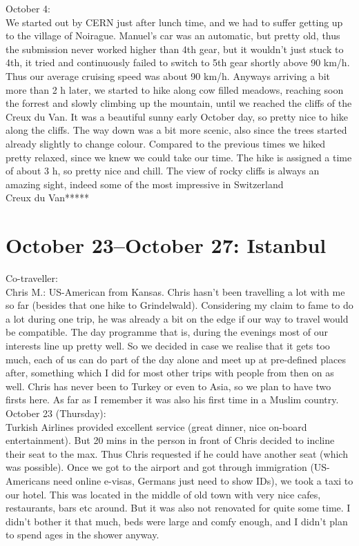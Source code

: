 October 4:\\
We started out by CERN just after lunch time, and we had to suffer getting up to the village of Noirague. Manuel's car was an automatic, but pretty old, thus the submission never worked higher than 4th gear, but it wouldn't just stuck to 4th, it tried and continuously failed to switch to 5th gear shortly above 90 km/h. Thus our average cruising speed was about 90 km/h. Anyways arriving a bit more than 2 h later, we started to hike along cow filled meadows, reaching soon the forrest and slowly climbing up the mountain, until we reached the cliffs of the Creux du Van. It was a beautiful sunny early October day, so pretty nice to hike along the cliffs. The way down was a bit more scenic, also since the trees started already slightly to change colour. Compared to the previous times we hiked pretty relaxed, since we knew we could take our time. The hike is assigned a time of about 3 h, so pretty nice and chill. The view of rocky cliffs is always an amazing sight, indeed some of the most impressive in Switzerland\\

Creux du Van*****

\section{October 23--October 27: Istanbul}
\label{Istanbul2014}

Co-traveller:\\
Chris M.: US-American from Kansas. Chris hasn't been travelling a lot with me so far (besides that one hike to Grindelwald). Considering my claim to fame to do a lot during one trip, he was already a bit on the edge if our way to travel would be compatible. The day programme that is, during the evenings most of our interests line up pretty well. So we decided in case we realise that it gets too much, each of us can do part of the day alone and meet up at pre-defined places after, something which I did for most other trips with people from then on as well. Chris has never been to Turkey or even to Asia, so we plan to have two firsts here. As far as I remember it was also his first time in a Muslim country.\\

October 23 (Thursday):\\
Turkish Airlines provided excellent service (great dinner, nice on-board entertainment). But 20 mins in the person in front of Chris decided to incline their seat to the max. Thus Chris requested if he could have another seat (which was possible). Once we got to the airport and got through immigration (US-Americans need online e-visas, Germans just need to show IDs), we took a taxi to our hotel. This was located in the middle of old town with very nice cafes, restaurants, bars etc around. But it was also not renovated for quite some time. I didn't bother it that much, beds were large and comfy enough, and I didn't plan to spend ages in the shower anyway.\\

